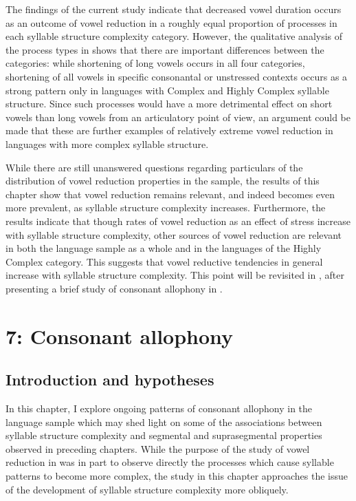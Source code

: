   The findings of the current study indicate that decreased vowel duration occurs as an outcome of vowel reduction in a roughly equal proportion of processes in each syllable structure complexity category. However, the qualitative analysis of the process types in  shows that there are important differences between the categories: while shortening of long vowels occurs in all four categories, shortening of all vowels in specific consonantal or unstressed contexts occurs as a strong pattern only in languages with Complex and Highly Complex syllable structure. Since such processes would have a more detrimental effect on short vowels than long vowels from an articulatory point of view, an argument could be made that these are further examples of relatively extreme vowel reduction in languages with more complex syllable structure.

  While there are still unanswered questions regarding particulars of the distribution of vowel reduction properties in the sample, the results of this chapter show that vowel reduction remains relevant, and indeed becomes even more prevalent, as syllable structure complexity increases. Furthermore, the results indicate that though rates of vowel reduction as an effect of stress increase with syllable structure complexity, other sources of vowel reduction are relevant in both the language sample as a whole and in the languages of the Highly Complex category. This suggests that vowel reductive tendencies in general increase with syllable structure complexity. This point will be revisited in , after presenting a brief study of consonant allophony in .

\chapter{7: Consonant allophony}
\section{Introduction and hypotheses}\label{sec:7.1}

  In this chapter, I explore ongoing patterns of consonant allophony in the language sample which may shed light on some of the associations between syllable structure complexity and segmental and suprasegmental properties observed in preceding chapters. While the purpose of the study of vowel reduction in  was in part to observe directly the processes which cause syllable patterns to become more complex, the study in this chapter approaches the issue of the development of syllable structure complexity more obliquely. 

